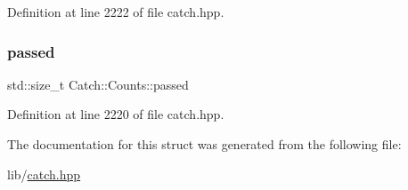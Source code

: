 Definition at line 2222 of file catch.\+hpp.

\hypertarget{struct_catch_1_1_counts_ad28daaf3de28006400208b6dd0c631e6}{}\label{struct_catch_1_1_counts_ad28daaf3de28006400208b6dd0c631e6} 
\subsubsection{\texorpdfstring{passed}{passed}}
{\footnotesize\ttfamily std\+::size\+\_\+t Catch\+::\+Counts\+::passed}



Definition at line 2220 of file catch.\+hpp.



The documentation for this struct was generated from the following file\+:\begin{DoxyCompactItemize}
\item 
lib/\hyperlink{catch_8hpp}{catch.\+hpp}\end{DoxyCompactItemize}
